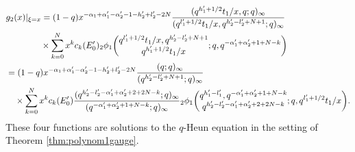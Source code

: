 \documentclass[12pt]{amsart}
\numberwithin{equation}{section}
\theoremstyle{definition}
\theoremstyle{remark}
\begin{document}
\begin{align}
  &  g_{2}(x) | _{\xi = x } = (1 - q)x^{- \alpha_{1} +\alpha_{1}' - \alpha_{2}' - 1 - h_{2}' + l_{2}' - 2N} \frac{(q^{h_{1}' + 1/2}t_{1}/x, q; q)_{\infty}}{(q^{l_{1}' + 1/2}t_{1}/x, q^{h_{2}' - l_{2}' + N + 1}; q)_{\infty}} \\
    & \qquad \qquad \times \sum_{k = 0}^{N} x^{k} c_{k} (E'_0 ) 
    {}_2\phi_1 \biggl( \begin{array}{@{}c@{}} q^{l_{1}' + 1/2}t_{1}/x, q^{h_{2}' - l_{2}' + N + 1} \\
q^{h_{1}' + 1/2}t_{1}/x \end{array} ;q,q^{-\alpha_{1}' + \alpha_{2}' + 1 + N - k} \biggr) \notag \\
   &= (1 - q)x^{ - \alpha_{1} + \alpha_{1}' - \alpha_{2}' - 1 - h_{2}' + l_{2}' - 2N} \frac{(q; q)_{\infty}}{(q^{h_{2}' - l_{2}' + N + 1}; q)_{\infty}} \notag \\
    &\quad \times \sum_{k = 0}^{N} x^{k} c_{k} (E'_0 ) \frac{(q^{h_{2}' - l_{2}' -\alpha_{1}' + \alpha_{2}' + 2 + 2N - k}; q)_{\infty}}{(q^{-\alpha_{1}' + \alpha_{2}' + 1 + N - k}; q)_{\infty}} {}_2\phi_1 \biggl( \begin{array}{@{}c@{}} q^{h_{1}' - l_{1}'}, q^{-\alpha_{1}' + \alpha_{2}' + 1 + N - k} \\
q^{h_{2}' - l_{2}' -\alpha_{1}' + \alpha_{2}' + 2 + 2N - k} \end{array} ;q,q^{l_{1}' + 1/2}t_{1}/x \biggr) . \notag
  \end{align}
These four functions are solutions to the $q$-Heun equation in the setting of Theorem \ref{thm:polynom1gauge}.
\end{document}

